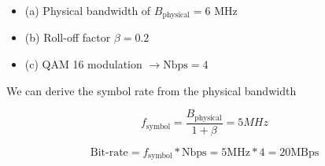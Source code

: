     \begin{itemize}
        \item (a) Physical bandwidth of $B_{\text{physical}} = 6$ MHz
        \item (b) Roll-off factor $\beta = 0.2$ 
        \item (c) QAM 16 modulation $\rightarrow \text{Nbps} = 4$
    \end{itemize}

We can derive the symbol rate from the physical bandwidth

\begin{equation*}
    f_{\text{symbol}} = \frac{B_{\text{physical}}}{1+\beta} = 5 MHz
\end{equation*}

\begin{equation*}
    \text{Bit-rate} = f_{\text{symbol}} * \text{Nbps} = 5 \text{MHz} * 4 = 20 \text{MBps}
\end{equation*}


